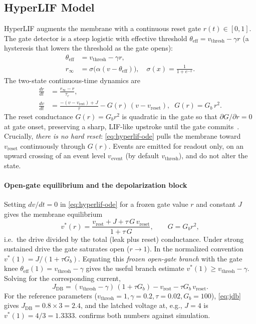 \documentclass[journal]{IEEEtran}
\newcommand{\vth}{v_{\mathrm{thresh}}}
\newcommand{\vr}{v_{\mathrm{rest}}}
\newcommand{\vre}{v_{\mathrm{reset}}}
\newcommand{\teff}{\theta_{\mathrm{eff}}}
\newcommand{\rinf}{r_{\infty}}
\newcommand{\Gb}{G_{b}}
\newcommand{\Jdb}{J_{\mathrm{DB}}}
\begin{document}
\subsection{HyperLIF Model}\label{sec:hyperlif}
HyperLIF augments the membrane with a continuous reset gate $r(t)\in[0,1]$. The
gate detector is a steep logistic with effective threshold
$\teff=\vth-\gamma r$ (a hysteresis that lowers the threshold as the gate opens):
\begin{align}
  \teff &= \vth - \gamma r, \label{eq:theta}\\
  \rinf &= \sigma\!\big(\alpha (v-\teff)\big), \quad
  \sigma(x) = \frac{1}{1+e^{-x}}. \label{eq:sigmoid}
\end{align}
The two-state continuous-time dynamics are
\begin{align}
  \frac{dr}{dt} &= \frac{\rinf - r}{\tau_r}, \label{eq:gate-ode}\\
  \frac{dv}{dt} &= \frac{-(v-\vr)+J}{\tau} - G(r)\,(v-\vre), \;\;
  G(r) = \Gb\, r^2. \label{eq:hyperlif-ode}
\end{align}
The reset conductance $G(r)=\Gb r^2$ is quadratic in the gate so that
$\partial G/\partial r = 0$ at gate onset, preserving a sharp, LIF-like upstroke
until the gate commits~\cite{hyperlif_theory}. Crucially, \emph{there is no hard
reset}: \cref{eq:hyperlif-ode} pulls the membrane toward $\vre$ continuously
through $G(r)$. Events are emitted for readout only, on an upward crossing of an
event level $v_{\mathrm{event}}$ (by default $\vth$), and do not alter the state.

\paragraph{Open-gate equilibrium and the depolarization block}
Setting $dv/dt=0$ in \cref{eq:hyperlif-ode} for a frozen gate value $r$ and
constant $J$ gives the membrane equilibrium
\begin{equation}
  v^\ast(r) = \frac{\vr + J + \tau\,G\,\vre}{1 + \tau\,G}, \qquad G=\Gb r^2,
  \label{eq:vstar}
\end{equation}
i.e.\ the drive divided by the total (leak plus reset) conductance. Under strong
sustained drive the gate saturates open ($r\to 1$). In the normalized convention
$v^\ast(1)=J/(1+\tau\Gb)$. Equating this \emph{frozen open-gate branch}
with the gate knee $\teff(1)=\vth-\gamma$ gives the useful branch estimate
$v^\ast(1)\ge \vth-\gamma$. Solving for the corresponding current,
\begin{equation}
  \boxed{\;\Jdb = (\vth-\gamma)\,(1+\tau\Gb) - \vr - \tau\Gb\,\vre.\;}
  \label{eq:jdb}
\end{equation}
For the reference parameters ($\vth=1,\gamma=0.2,\tau=0.02,\Gb=100$),
\cref{eq:jdb} gives $\Jdb=0.8\times 3 = 2.4$, and the latched voltage at, e.g.,
$J=4$ is $v^\ast(1)=4/3=1.3333$.  confirms both numbers
against simulation.
\end{document}
